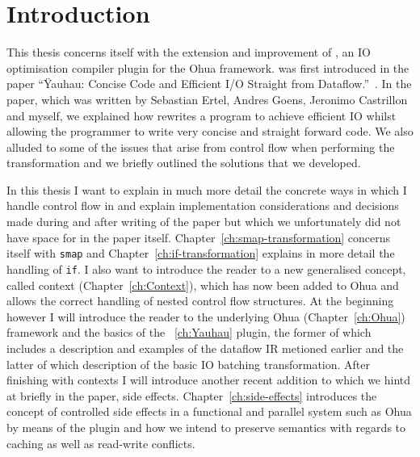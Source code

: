 \chapter{Introduction}

\label{ch:Intro}

This thesis concerns itself with the extension and improvement of \yauhau{}, an IO optimisation compiler plugin for the Ohua framework.
\yauhau{} was first introduced in the paper ``Ÿauhau: Concise Code and Efficient I/O Straight from Dataflow.''~\cite{ErtelGoensAdamEtAl2016}.
In the paper, which was written by Sebastian Ertel, Andres Goens, Jeronimo Castrillon and myself, we explained how \yauhau{} rewrites a program to achieve efficient IO whilst allowing the programmer to write very concise and straight forward code.
We also alluded to some of the issues that arise from control flow when performing the \yauhau{} transformation and we briefly outlined the solutions that we developed.

In this thesis I want to explain in much more detail the concrete ways in which I handle control flow in \yauhau{} and explain implementation considerations and decisions made during and after writing of the paper but which we unfortunately did not have space for in the paper itself.
Chapter~\ref{ch:smap-transformation} concerns itself with \texttt{smap} and Chapter~\ref{ch:if-transformation} explains in more detail the handling of \texttt{if}.
I also want to introduce the reader to a new generalised concept, called context (Chapter~\ref{ch:Context}), which has now been added to Ohua and allows the correct handling of nested control flow structures.
At the beginning however I will introduce the reader to the underlying Ohua (Chapter~\ref{ch:Ohua}) framework and the basics of the \yauhau{}~\ref{ch:Yauhau} plugin, the former of which includes a description and examples of the dataflow IR metioned earlier and the latter of which description of the basic IO batching transformation.
After finishing with contexts I will introduce another recent addition to \yauhau{} which we hintd at briefly in the paper, side effects.
Chapter~\ref{ch:side-effects} introduces the concept of controlled side effects in a functional and parallel system such as Ohua by means of the \yauhau{} plugin and how we intend to preserve semantics with regards to caching as well as read-write conflicts.

